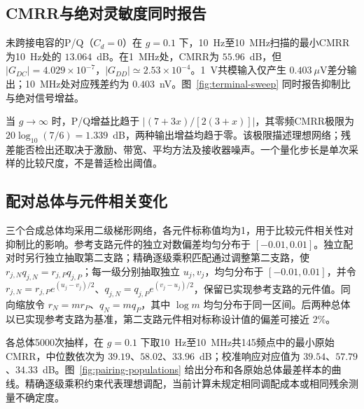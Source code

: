 \subsection{CMRR与绝对灵敏度同时报告}

未跨接电容的P/Q（$C_d=0$）在 $g=0.1$ 下，10~Hz至10~MHz扫描的最小CMRR为10~Hz处的 $13.064$~dB。在1~MHz处，CMRR为 $55.96$~dB，但 $|G_{DC}|=4.029\times10^{-7}$，$|G_{DD}|\simeq2.53\times10^{-4}$。1~V共模输入仅产生 $0.403~\mu$V差分输出；10~MHz处对应残差约为 $0.403$~nV。图~\ref{fig:terminal-sweep} 同时报告抑制比与绝对信号增益。

当 $g\to\infty$ 时，P/Q增益比趋于 $|(7+3x)/[2(3+x)]|$，其零频CMRR极限为 $20\log_{10}(7/6)=1.339$~dB，两种输出增益均趋于零。该极限描述理想网络；残差能否检出还取决于激励、带宽、平均方法及接收器噪声。一个量化步长是单次采样的比较尺度，不是普适检出阈值。



\subsection{配对总体与元件相关变化}

三个合成总体均采用二级梯形网络，各元件标称值均为1，用于比较元件相关性对抑制比的影响。参考支路元件的独立对数偏差均匀分布于 $[-0.01,0.01]$。独立配对时另行独立抽取第二支路；精确逐级乘积匹配通过调整第二支路，使 $r_{j,N}q_{j,N}=r_{j,P}q_{j,P}$；每一级分别抽取独立 $u_j,v_j$，均匀分布于 $[-0.01,0.01]$，并令 $r_{j,N}=r_{j,P}e^{(u_j-v_j)/2}$、$q_{j,N}=q_{j,P}e^{(v_j-u_j)/2}$，保留已实现参考支路的元件值。同向缩放令 $r_N=mr_P$、$q_N=mq_P$，其中 $\log m$ 均匀分布于同一区间。后两种总体以已实现参考支路为基准，第二支路元件相对标称设计值的偏差可接近 $2\%$。

各总体5000次抽样，在 $g=0.1$ 下取10~Hz至10~MHz共145频点中的最小原始CMRR，中位数依次为 $39.19$、$58.02$、$33.96$~dB；校准响应对应值为 $39.54$、$57.79$、$34.33$~dB。图~\ref{fig:pairing-populations} 给出分布和各原始总体最差样本的曲线。精确逐级乘积约束代表理想调配，当前计算未规定相同调配成本或相同残余测量不确定度。




